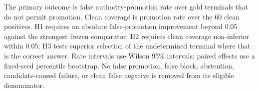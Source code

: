 The primary outcome is false authority-promotion rate over gold terminals that do not permit promotion. Clean coverage is promotion rate over the 60 clean positives. H1 requires an absolute false-promotion improvement beyond 0.05 against the strongest frozen comparator; H2 requires clean coverage non-inferior within 0.05; H3 tests superior selection of the undetermined terminal where that is the correct answer. Rate intervals use Wilson 95\% intervals; paired effects use a fixed-seed percentile bootstrap. No false promotion, false block, abstention, candidate-caused failure, or clean false negative is removed from its eligible denominator.

